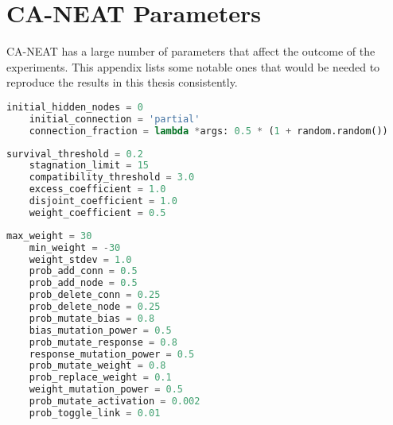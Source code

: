 \chapter{CA-NEAT Parameters}
\label{app:parameters}
CA-NEAT has a large number of parameters that affect the outcome of the experiments.
This appendix lists some notable ones that would be needed to reproduce the results in this thesis consistently.

\begin{lstlisting}[language=Python, caption={
Parameters that define the initial population.
Notably, for each generated individual,
the ratio of connectivity is determined individually to be a value between $0.5$ and $1.0$.
}]
    initial_hidden_nodes = 0
    initial_connection = 'partial'
    connection_fraction = lambda *args: 0.5 * (1 + random.random())
\end{lstlisting}

\begin{lstlisting}[language=Python, caption={
Parameters that have to do with selection and speciation
}]
    survival_threshold = 0.2
    stagnation_limit = 15
    compatibility_threshold = 3.0
    excess_coefficient = 1.0
    disjoint_coefficient = 1.0
    weight_coefficient = 0.5
\end{lstlisting}

\begin{minipage}{\linewidth}
\begin{lstlisting}[language=Python, caption={
Parameters that have to do with mutation
}]
    max_weight = 30
    min_weight = -30
    weight_stdev = 1.0
    prob_add_conn = 0.5
    prob_add_node = 0.5
    prob_delete_conn = 0.25
    prob_delete_node = 0.25
    prob_mutate_bias = 0.8
    bias_mutation_power = 0.5
    prob_mutate_response = 0.8
    response_mutation_power = 0.5
    prob_mutate_weight = 0.8
    prob_replace_weight = 0.1
    weight_mutation_power = 0.5
    prob_mutate_activation = 0.002
    prob_toggle_link = 0.01
\end{lstlisting}
\end{minipage}
